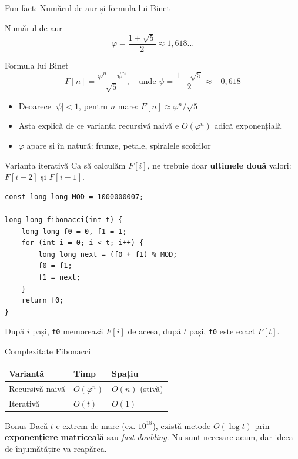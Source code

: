 ﻿\documentclass{beamer}
\begin{document}
\begin{frame}{Fun fact: Numărul de aur și formula lui Binet}
  \begin{block}{Numărul de aur}
    \[
      \varphi = \frac{1 + \sqrt{5}}{2} \approx 1{,}618\ldots
    \]
  \end{block}

  \begin{block}{Formula lui Binet}
    \[
      F[n] = \frac{\varphi^n - \psi^n}{\sqrt{5}}, \quad \text{unde } \psi = \frac{1 - \sqrt{5}}{2} \approx -0{,}618
    \]
  \end{block}

  \begin{itemize}
    \item Deoarece $|\psi| < 1$, pentru $n$ mare: $F[n] \approx \varphi^n / \sqrt{5}$
    \item Asta explică de ce varianta recursivă naivă e $O(\varphi^n)$ \textemdash{} adică exponențială
    \item $\varphi$ apare și în natură: frunze, petale, spiralele scoicilor
  \end{itemize}
\end{frame}

\begin{frame}[fragile]{Varianta iterativă}
  Ca să calculăm $F[i]$, ne trebuie doar \textbf{ultimele două} valori: $F[i-2]$ și $F[i-1]$.
  \begin{lstlisting}
const long long MOD = 1000000007;

long long fibonacci(int t) {
    long long f0 = 0, f1 = 1;
    for (int i = 0; i < t; i++) {
        long long next = (f0 + f1) % MOD;
        f0 = f1;
        f1 = next;
    }
    return f0;
}
  \end{lstlisting}
  După $i$ pași, \lstinline|f0| memorează $F[i]$ \textemdash{} de aceea, după $t$ pași, \lstinline|f0| este exact $F[t]$.
\end{frame}

\begin{frame}{Complexitate \textemdash{} Fibonacci}
  \begin{center}
  \begin{tabular}{lll}
    \toprule
    Variantă & Timp & Spațiu \\
    \midrule
    Recursivă naivă & $O(\varphi^n)$ & $O(n)$ (stivă) \\
    Iterativă        & $O(t)$        & $O(1)$ \\
    \bottomrule
  \end{tabular}
  \end{center}

  \smallskip
  \begin{block}{Bonus}
    Dacă $t$ e extrem de mare (ex. $10^{18}$), există metode $O(\log t)$ prin \textbf{exponențiere matriceală} sau \textit{fast doubling}. Nu sunt necesare acum, dar ideea de înjumătățire va reapărea.
  \end{block}
\end{frame}
\end{document}
